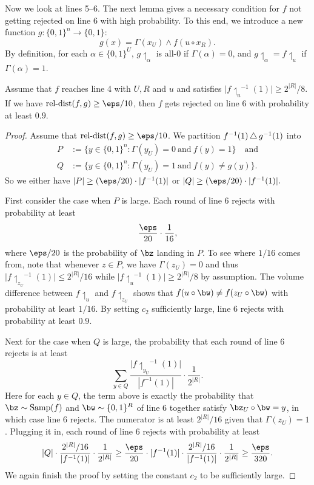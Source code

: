 \documentclass[11pt]{article}
\theoremstyle{definition}
\begin{document}
Now we look at lines 5--6. 
The next lemma gives a necessary condition
  for $f$ not getting rejected on line {6}
with high probability.
To this end, we introduce a new function
$g:\{0,1\}^n\rightarrow \{0,1\}$:
$$
g(x)=\Gamma(x_U) {\wedge} f(u\circ x_R).
$$  
By definition, for each $\alpha\in \{0,1\}^U$, $g{\upharpoonleft_{\alpha}}$ is all-$0$ if $\Gamma(\alpha)=0$, and $g{\upharpoonleft_{\alpha}}=f{\upharpoonleft_{ u}}$ if $\Gamma(\alpha)=1$.
\begin{lemma}\label{thm: f close to g (DL case)}
Assume that $f$ reaches line 4 with $U,R$ and $u$ and satisfies 
  $ |f{\upharpoonleft_{u}}^{-1}(1)|\ge 2^{|R|}/8.$
If we have $\reldist(f,g) \geq \eps/10$,
  then $f$ gets rejected on line 6 with probability at least $0.9$.
\end{lemma}
\begin{proof}
Assume that $\reldist(f,g)\ge \eps/10$. 
We partition $f^{-1}(1)\hspace{0.06cm}\triangle\hspace{0.06cm} g^{-1}(1)$ into
\begin{align*}
P&:=\big\{y\in \{0,1\}^n: \Gamma(y_U)=0\ \text{and}\ f(y)=1\big\}\quad\text{and}\\[1ex]
Q&:=\big\{y\in \{0,1\}^n: \Gamma(y_U)=1\ \text{and}\ 
f(y)\ne g(y)\big\}.
\end{align*}
So we either have $|P|\ge (\eps/20)\cdot |f^{-1}(1)|$ or $|Q|\ge (\eps/20)\cdot |f^{-1}(1)|.$

First consider the case when $P$ is large.
Each round of line 6 rejects with probability at least
$$
 \frac{\eps}{20} \cdot \frac{1}{16},
$$
where $\eps/20$ is the probability of $\bz$ landing in $P$.
To see where $1/16$ comes from, note that whenever $z\in P$, we have $\Gamma( z_U) =0$ and thus $|f{\upharpoonleft_{z_U}}^{-1}(1)|\le 2^{|R|}/16$
  while $|f{\upharpoonleft_{u}}^{-1}(1)|\ge 2^{|R|}/8$ by assumption.
The volume difference between $f{\upharpoonleft_{ u}}$
  and $f{\upharpoonleft_{ z_U}}$ shows that $f(u\circ \bw)\ne f( z_U\circ \bw)$ with probability at least $1/16$.
By setting $c_2$ sufficiently large, line 6 rejects with probability at least $0.9$.

Next for the case when $Q$ is large,
the probability that each round of line {6}
rejects is at least
$$
\sum_{y\in Q}
 \frac{ |f{\upharpoonleft_{ y_U}}^{-1}(1)|}{|f^{-1}(1)|}\cdot \frac{1}{2^{|R|}}.
$$
{Here for each $y \in Q$, the term above is exactly the probability that 
  $\bz\sim \SAMP(f)$ and $\bw\sim \{0,1\}^R$ of line 6 together satisfy
  $\bz_U\circ \bw=y$, in which case line 6 rejects.}
The numerator is at least $2^{|R|}/16$ given that  $\Gamma(z_U)=1$.
Plugging it in, each round of line {6} 
rejects with probability at least 
$$
|Q| \cdot \frac{2^{|R|}/16}{|f^{-1}(1)|}\cdot \frac{1}{2^{|R|}}\ge 
\frac{\eps}{20}\cdot |f^{-1}(1)|\cdot \frac{2^{|R|}/16}{|f^{-1}(1)|}\cdot \frac{1}{2^{|R|}}\ge \frac{\eps}{320}.
$$
We again finish the proof by setting the constant
  $c_2$ to be sufficiently large.
\end{proof}
\end{document}
